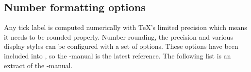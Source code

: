 \subsection{Number formatting options}
\begingroup
\def\examplenumbers{%
	4.568,5e-04,0.1,24415.98123,123456.12345%
}%
\def\showexamplenumberswith#1{%
	\expandafter\showexamplenumberswithXX\expandafter{\examplenumbers}{#1}%
}%
\def\showexamplenumberswithXX#1#2{{%
	\small
	\noindent Example:

	\noindent
	{\ttfamily\textbackslash pgfkeys\{/pgf/number format/.cd,#2\}\par\noindent
	\foreach \x in {#1} {%
		\textbackslash pgfmathprintnumber\{\x\}\par\noindent
	}%
	}%
	 leads to 
	\pgfkeys{/pgf/number format/.cd,#2}%
	\foreach \x in {#1} {\pgfmathprintnumber{\x}\hspace{1em}}\unskip.
}}%
\label{sec:number:printing}%
Any tick label is computed numerically with \TeX's limited precision which means it needs to be rounded properly. Number rounding, the precision and various display styles can be configured with a set of options. These options have been included into \PGF, so the \PGF-manual is the latest reference. The following list is an extract of the \PGF-manual.

